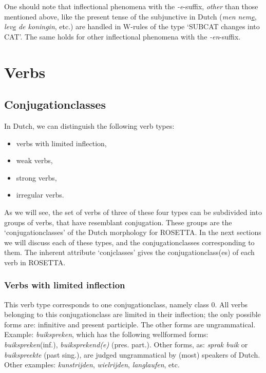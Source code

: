 One should note that inflectional phenomena with the {\em -e}-suffix,
{\em other} than those mentioned above,
like the present tense of the subjunctive in Dutch ({\em men nem\underline{e}}, 
{\em lev\underline{e} de koningin}, etc.) are handled in 
W-rules of the type `SUBCAT changes into
CAT'. The same holds for other inflectional phenomena with the {\em -en}-suffix.

\newpage

\section{Verbs}
\subsection{Conjugationclasses}
In Dutch, we can distinguish the following verb types:

\begin{itemize}
 \item verbs with limited inflection,
 \item weak verbs,
 \item strong verbs,
 \item irregular verbs.
\end{itemize}

As we will see, the set of verbs of three of these four types can 
be subdivided 
into groups of verbs, that have resemblant conjugation. These groups are
the `conjugationclasses' of the Dutch morphology for ROSETTA.
In the next sections we will discuss each of these types, and the 
conjugationclasses corresponding to them. The inherent attribute `conjclasses'
gives the conjugationclass(es) of each verb in ROSETTA.


\subsubsection{Verbs with limited inflection}

This verb type corresponds to one conjugationclass, namely class 0. All
verbs belonging to this conjugationclass are limited in their inflection;
the only possible forms are: infinitive and present participle. The other
forms are ungrammatical. Example: {\em buikspreken}, which
has the following wellformed forms: {\em buikspreken}(inf.),  
{\em buiksprekend(e)} 
(pres. part.). Other forms, as: {\em sprak buik} or {\em buikspreekte}
(past sing.), are judged ungrammatical by (most) speakers of Dutch.
Other examples: {\em kunstrijden}, {\em wielrijden}, 
{\em langlaufen}, etc.

